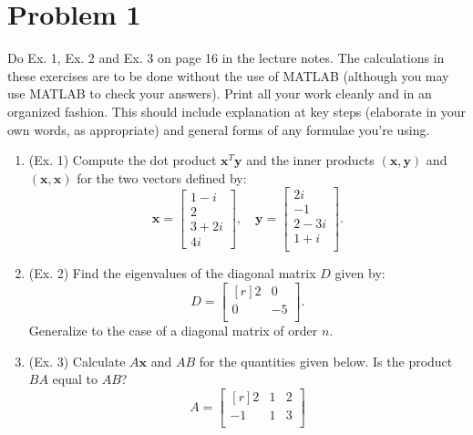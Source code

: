 \section{Problem 1}%
\label{sec:problem_1}
Do Ex. 1, Ex. 2 and Ex. 3 on page 16 in the lecture notes. The calculations in these exercises are to be done without the use of MATLAB (although you may use MATLAB to check your answers). Print all your work cleanly and in an organized fashion. This should include explanation at key steps (elaborate in your own words, as appropriate) and general forms of any formulae you're using.
\begin{enumerate}
  \item (Ex. 1) Compute the dot product $\mathbf{x}^{T} \mathbf{y}$ and the inner products $(\mathbf{x}, \mathbf{y})$ and $(\mathbf{x}, \mathbf{x})$ for the two vectors defined by:
    \begin{equation*}
      \mathbf{x} = \begin{bmatrix}
        1 - i \\
        2 \\
        3 + 2i \\
        4i
      \end{bmatrix}, \quad
      \mathbf{y} = \begin{bmatrix}
        2i \\
        -1 \\
        2 - 3i \\
        1 + i \\
      \end{bmatrix}.
    \end{equation*}
  \item (Ex. 2) Find the eigenvalues of the diagonal matrix $D$ given by:
    \begin{equation*}
      D = \begin{bmatrix*}[r]
        2 & 0 \\
        0 & -5 \\
      \end{bmatrix*}.
    \end{equation*}
    Generalize to the case of a diagonal matrix of order $n$.
  \item (Ex. 3) Calculate $A \mathbf{x}$ and $AB$ for the quantities given below. Is the product $BA$ equal to $AB$?
    \begin{equation*}
      A = \begin{bmatrix*}[r]
        2  & 1 & 2 \\
        -1 & 1 & 3 \\

\end{bmatrix*}
\end{equation*}
\end{enumerate}
